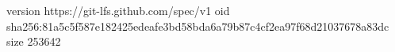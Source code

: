 version https://git-lfs.github.com/spec/v1
oid sha256:81a5c5f587e182425edeafe3bd58bda6a79b87c4cf2ea97f68d21037678a83dc
size 253642
